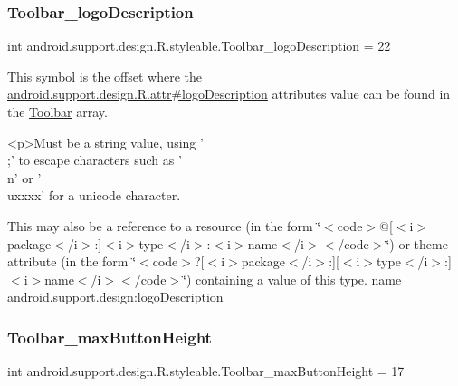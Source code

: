 \subsubsection{\texorpdfstring{Toolbar\+\_\+logo\+Description}{Toolbar\_logoDescription}}
{\footnotesize\ttfamily int android.\+support.\+design.\+R.\+styleable.\+Toolbar\+\_\+logo\+Description = 22\hspace{0.3cm}{\ttfamily [static]}}

This symbol is the offset where the \hyperlink{classandroid_1_1support_1_1design_1_1R_1_1attr_a907be73d8821c072ce87eae8264bbe50}{android.\+support.\+design.\+R.\+attr\#logo\+Description} attribute\textquotesingle{}s value can be found in the \hyperlink{classandroid_1_1support_1_1design_1_1R_1_1styleable_a7783ebe780dbe2a845802a40519a46e9}{Toolbar} array.

\begin{DoxyVerb}      <p>Must be a string value, using '\\;' to escape characters such as '\\n' or '\\uxxxx' for a unicode character.
\end{DoxyVerb}
 

This may also be a reference to a resource (in the form \char`\"{}$<$code$>$@\mbox{[}$<$i$>$package$<$/i$>$\+:\mbox{]}$<$i$>$type$<$/i$>$\+:$<$i$>$name$<$/i$>$$<$/code$>$\char`\"{}) or theme attribute (in the form \char`\"{}$<$code$>$?\mbox{[}$<$i$>$package$<$/i$>$\+:\mbox{]}\mbox{[}$<$i$>$type$<$/i$>$\+:\mbox{]}$<$i$>$name$<$/i$>$$<$/code$>$\char`\"{}) containing a value of this type.  name android.\+support.\+design\+:logo\+Description \mbox{\label{classandroid_1_1support_1_1design_1_1R_1_1styleable_a23d4ceb83bb1200d96e248f73e941f3e}} 
\subsubsection{\texorpdfstring{Toolbar\+\_\+max\+Button\+Height}{Toolbar\_maxButtonHeight}}
{\footnotesize\ttfamily int android.\+support.\+design.\+R.\+styleable.\+Toolbar\+\_\+max\+Button\+Height = 17\hspace{0.3cm}{\ttfamily [static]}}

